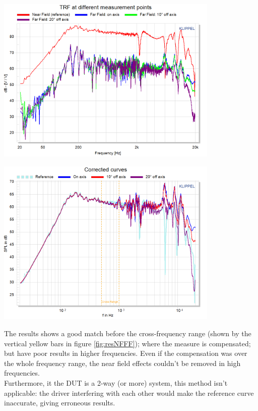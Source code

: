 \documentclass{report}
\begin{document}
\vspace{0.4cm}

\begin{minipage}{0.5\textwidth}
\begin{center}
	\includegraphics[width=0.8\textwidth]{RoomComp/NF_FF_compa} 
    \captionsetup{hypcap=false} 
	\label{fig:rawNFFF}
\end{center}
\end{minipage}
\begin{minipage}{0.5\textwidth}
\begin{center}
	\includegraphics[width=0.8\textwidth]{RoomComp/NF_FF_result} 
    \captionsetup{hypcap=false} 
	\label{fig:resNFFF}
\end{center}
\end{minipage}
\vspace{0.2cm}

The results shows a good match before the cross-frequency range (shown by the vertical yellow bars in figure \ref{fig:resNFFF}); where the measure is compensated; but have poor results in higher frequencies. Even if the compensation was over the whole frequency range, the near field effects couldn't be removed in high frequencies.\\
Furthermore, it the DUT is a 2-way (or more) system, this method isn't applicable: the driver interfering with each other would make the reference curve inaccurate,  giving erroneous results. 
\end{document}
